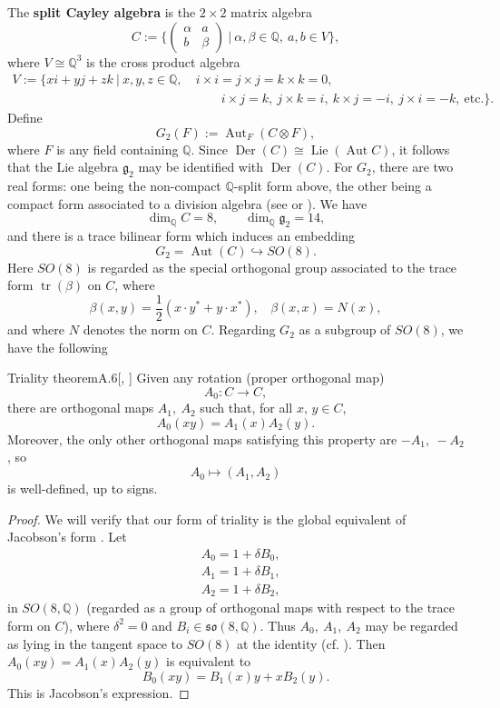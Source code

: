 \documentclass[12pt,letterpaper]{amsart}
\theoremstyle{plain}
\theoremstyle{definition}
\theoremstyle{remark}
\theoremstyle{definition}
\newcommand{\qqq}{\mathbb{Q}}
\DeclareMathOperator{\Lie}{Lie}
\DeclareMathOperator{\tr}{tr}
\DeclareMathOperator{\Der}{Der}
\DeclareMathOperator{\Aut}{Aut}
\begin{document}
The \textbf{split Cayley algebra} is the $2\times 2$ matrix algebra
\[
C:=\Big\{\begin{pmatrix} \alpha&a\\b&\beta \end{pmatrix}\ | \
\alpha ,\beta \in \qqq,\ a,b \in V \Big\},\tag{A.4}
\]
where $V \cong \qqq^3$ is the cross product algebra
\[
\begin{split}
V:= \{ xi+yj+zk\ | \ x,y,z \in \qqq,
&\ i\times i = j\times j = k\times k = 0,\\
&\quad\quad
\ i\times j = k,\ j\times k = i,\ k\times j = -i,\ j\times i = -k,
\ \text{etc.}\}.
\end{split}
\]
Define
\[
G_2(F) :=\Aut_F(C\otimes F),\tag{A.5}
\]
where $F$ is any field containing $\qqq$. Since $\Der(C) \cong \Lie(\Aut C)$,
it follows that the Lie algebra ${\mathfrak g}_2$ may be
identified with $\Der(C)$. For $G_2$, there are two real forms: one
being the non-compact $\qqq$-split form above, the other being a
compact form associated to a division algebra (see \cite[pp.~142--147]{Ja71}
or \cite{Ti65}). We have
\[
\dim_{{\qqq}}C = 8,\qquad \dim_{{\qqq}}{\mathfrak g}_2 = 14,
\]
and there is a trace bilinear form which induces an embedding
\[
G_2 = \Aut(C) \hookrightarrow SO(8).
\]
Here $SO(8)$ is regarded as the special orthogonal group associated to
the trace form $\tr(\beta)$ on $C$, where
\[
\beta(x,y)=\frac{1}{2}(x\cdot y^*+y\cdot x^*),
\ \ \ \ \beta(x,x)=N(x),
\]
and where $N$ denotes the norm on $C$. Regarding $G_2$ as a subgroup of
$SO(8)$, we have the following

\begin{res}{Triality theorem}{A.6}[\cite{Ja71}, \cite{SV00}]\label{res:A.6} Given any rotation (proper orthogonal map)
\[
A_0 : C \rightarrow C,
\]
there are orthogonal maps $A_1,\ A_2$ such that, for all $x,\,y \in C$,
\[
A_0(xy) = A_1(x)A_2(y).
\]
Moreover, the only other orthogonal maps satisfying this property are
$-A_1,\ -A_2$, so
\[
A_0 \longmapsto (A_1,A_2)
\]
is well-defined, up to signs.
\end{res}

\begin{proof} We will verify that our form of triality is the global
equivalent of Jacobson's form \cite[p. 8]{Ja71}. Let
\[
\begin{split}
&A_0 = 1+\delta B_0,\\
&A_1 = 1+\delta B_1,\\
&A_2 = 1+\delta B_2,
\end{split}
\]
in $SO(8,\qqq )$ (regarded as a group of orthogonal maps with respect to the
trace form on $C$), where $\delta^2 = 0$ and $B_i \in \mathfrak{so}(8,\qqq )$. Thus
$A_0,\ A_1,\ A_2$ may be regarded as lying in the tangent space to $SO(8)$
at the identity (cf. \cite[chapter 0]{Bor91}). Then
$A_0(xy) = A_1(x)A_2(y)$ is equivalent to
\[
B_0(xy) = B_1(x)y+ xB_2(y).
\]
This is Jacobson's expression.
\end{proof}
\end{document}
